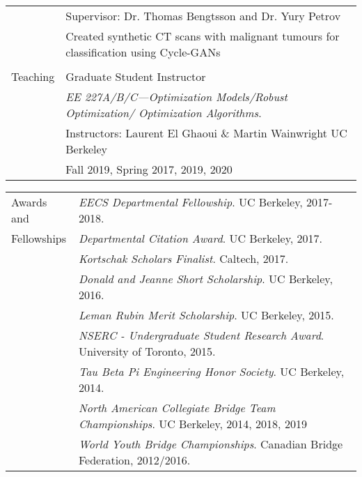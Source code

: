 \documentclass[letterpaper,10pt,oneside]{article}
\begin{document}
\begin{tabular}{@{} l l}
    & Supervisor: Dr. Thomas Bengtsson and Dr. Yury Petrov \\
    & Created synthetic CT scans with malignant tumours for classification using Cycle-GANs\\
    &\\
  \Large{Teaching}   & Graduate Student Instructor\\
  &\textit{EE 227A/B/C---Optimization Models/Robust Optimization/ Optimization Algorithms}. \\
     & Instructors: Laurent El Ghaoui \& Martin Wainwright UC Berkeley\\
     & Fall 2019, Spring 2017, 2019, 2020 \\
     \end{tabular}
     \noindent \begin{tabular}{@{} l l}
 \Large{Awards and }    & \textit{EECS Departmental Fellowship}. UC Berkeley, 2017-2018. \\
  \Large{Fellowships}   & \textit{Departmental Citation Award}. UC Berkeley, 2017. \\
     & \textit{Kortschak Scholars Finalist}. Caltech, 2017.\\
     & \textit{Donald and Jeanne Short Scholarship}. UC Berkeley, 2016. \\
     & \textit{Leman Rubin Merit Scholarship}. UC Berkeley, 2015.\\
     & \textit{NSERC - Undergraduate Student Research Award}. University of Toronto, 2015.\\
     & \textit{Tau Beta Pi Engineering Honor Society}. UC Berkeley, 2014.\\
      & \textit{North American Collegiate Bridge Team Championships}. UC Berkeley, 2014, 2018, 2019\\
     & \textit{World Youth Bridge Championships}. Canadian Bridge Federation, 2012/2016. \\
\end{tabular}

\newpage
\end{document}
